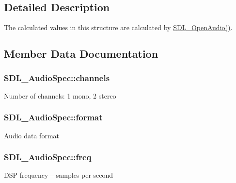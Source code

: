 \subsection{Detailed Description}
The calculated values in this structure are calculated by \hyperlink{SDL__audio_8h_a2edf30e7747584e28041b4986f89f440}{S\+D\+L\+\_\+\+Open\+Audio()}. 

\subsection{Member Data Documentation}
\hypertarget{structSDL__AudioSpec_a31fe8b3710cf23bbef24be8a1749fe46}{}
\subsubsection[{channels}]{ S\+D\+L\+\_\+\+Audio\+Spec\+::channels}\label{structSDL__AudioSpec_a31fe8b3710cf23bbef24be8a1749fe46}
Number of channels\+: 1 mono, 2 stereo \hypertarget{structSDL__AudioSpec_ae37c634cac5807762f184c8d5d49fc2d}{}
\subsubsection[{format}]{ S\+D\+L\+\_\+\+Audio\+Spec\+::format}\label{structSDL__AudioSpec_ae37c634cac5807762f184c8d5d49fc2d}
Audio data format \hypertarget{structSDL__AudioSpec_a8b823ce46fc2e448cf7e6fc141aff6b2}{}
\subsubsection[{freq}]{ S\+D\+L\+\_\+\+Audio\+Spec\+::freq}\label{structSDL__AudioSpec_a8b823ce46fc2e448cf7e6fc141aff6b2}
D\+S\+P frequency -- samples per second \hypertarget{structSDL__AudioSpec_a738371fc13b54cefef4db16994abeeb6}{}

